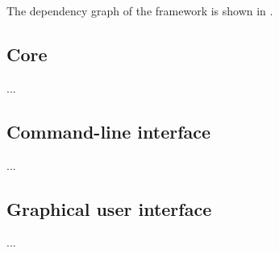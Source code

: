 The dependency graph of the framework is shown in .


\subsection{Core}

...

\subsection{Command-line interface}

...

\subsection{Graphical user interface}

...
